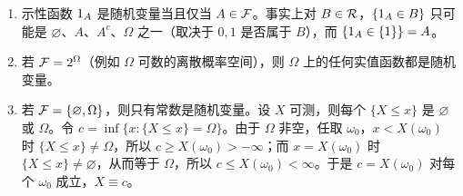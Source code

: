 \begin{example}\label{ex:random-variables:basic}
\begin{enumerate}
\item 示性函数 $1_A$ 是随机变量当且仅当 $A\in\mathcal{F}$。事实上对 $B\in\mathcal{R}$，$\{1_A\in B\}$ 只可能是 $\varnothing$、$A$、$A^c$、$\Omega$ 之一（取决于 $0,1$ 是否属于 $B$），而 $\{1_A\in\{1\}\}=A$。
\item 若 $\mathcal{F}=2^\Omega$（例如 $\Omega$ 可数的离散概率空间），则 $\Omega$ 上的任何实值函数都是随机变量。
\item 若 $\mathcal{F}=\{\varnothing,\Omega\}$，则只有常数是随机变量。设 $X$ 可测，则每个 $\{X\leqslant x\}$ 是 $\varnothing$ 或 $\Omega$。令 $c=\inf\{x:\{X\leqslant x\}=\Omega\}$。由于 $\Omega$ 非空，任取 $\omega_0$，$x<X(\omega_0)$ 时 $\{X\leqslant x\}\neq\Omega$，所以 $c\geqslant X(\omega_0)>-\infty$；而 $x=X(\omega_0)$ 时 $\{X\leqslant x\}\neq\varnothing$，从而等于 $\Omega$，所以 $c\leqslant X(\omega_0)<\infty$。于是 $c=X(\omega_0)$ 对每个 $\omega_0$ 成立，$X\equiv c$。
\end{enumerate}
\end{example}

